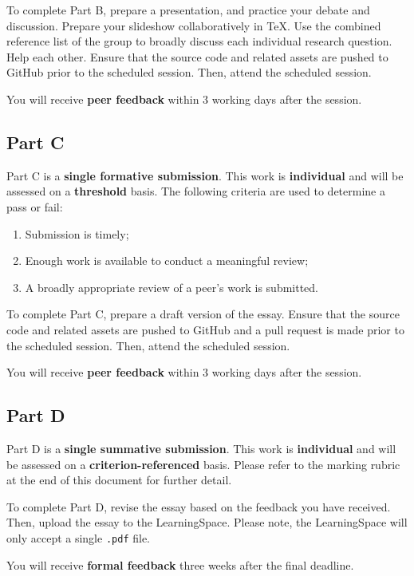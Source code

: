 \documentclass{../fal_assignment}
\begin{document}
To complete Part B, prepare a presentation, and practice your debate and discussion. Prepare your slideshow collaboratively in TeX. Use the combined reference list of the group to broadly discuss each individual research question. Help each other. Ensure that the source code and related assets are pushed to GitHub prior to the scheduled session. Then, attend the scheduled session.

You will receive \textbf{peer feedback} within 3 working days after the session.

\subsection*{Part C}

Part C is a \textbf{single formative submission}. This work is \textbf{individual} and will be assessed on a \textbf{threshold} basis. The following criteria are used to determine a pass or fail:

\begin{enumerate}[label=(\alph*)]
	\item Submission is timely;
	\item Enough work is available to conduct a meaningful review;
	\item A broadly appropriate review of a peer's work is submitted.
\end{enumerate}

To complete Part C, prepare a draft version of the essay. Ensure that the source code and related assets are pushed to GitHub and a pull request is made prior to the scheduled session. Then, attend the scheduled session.

You will receive \textbf{peer feedback} within 3 working days after the session.

\subsection*{Part D}

Part D is a \textbf{single summative submission}. This work is \textbf{individual} and will be assessed on a \textbf{criterion-referenced} basis. Please refer to the marking rubric at the end of this document for further detail.

To complete Part D, revise the essay based on the feedback you have received. Then, upload the essay to the LearningSpace. Please note, the LearningSpace will only accept a single \texttt{.pdf} file.

You will receive \textbf{formal feedback} three weeks after the final deadline.
\end{document}
